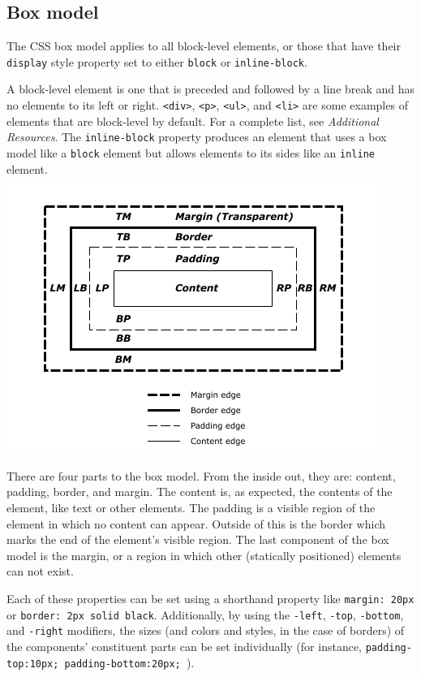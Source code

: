 \documentclass[12pt]{article}
\begin{document}
\subsection{Box model}
The CSS box model applies to all block-level elements, or those that have their \texttt{display} style property set to either \texttt{block} or \texttt{inline-block}.
\par
A block-level element is one that is preceded and followed by a line break and has no elements to its left or right. \texttt{<div>}, \texttt{<p>}, \texttt{<ul>}, and \texttt{<li>} are some examples of elements that are block-level by default. For a complete list, see \emph{Additional Resources}. The \texttt{inline-block} property produces an element that uses a box model like a \texttt{block} element but allows elements to its sides like an \texttt{inline} element.
\\
\includegraphics{images/box_model.png}
\par
There are four parts to the box model. From the inside out, they are: content, padding, border, and margin. The content is, as expected, the contents of the element, like text or other elements. The padding is a visible region of the element in which no content can appear. Outside of this is the border which marks the end of the element's visible region. The last component of the box model is the margin, or a region in which other (statically positioned) elements can not exist.
\par
Each of these properties can be set using a shorthand property like \texttt{margin: 20px} or \texttt{border: 2px solid black}. Additionally, by using the \texttt{-left}, \texttt{-top}, \texttt{-bottom}, and \texttt{-right} modifiers, the sizes (and colors and styles, in the case of borders) of the components' constituent parts can be set individually (for instance, \texttt{padding-top:10px; padding-bottom:20px; }).
\end{document}
